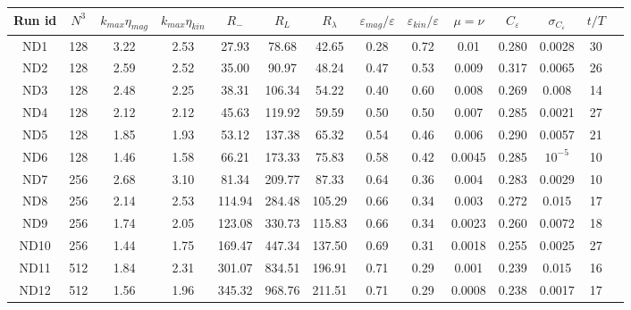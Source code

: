 \documentclass[aps,pre,onecolumn,superscriptaddress,notitlepage]{revtex4-1}
\newcommand{\Ceps}{C_\varepsilon}
\newcommand{\Rl}{R_{\lambda}}
\newcommand{\vep}{\varepsilon}
\begin{document}
 \begin{table}[]
 \begin{center}
 \begin{tabular}{cccccccccccccc}
   Run id & $N^3$  & $k_{max}\eta_{mag}$ & $k_{max}\eta_{kin}$ & $R_{-}$ & $R_L$ & $\Rl$ & $\vep_{mag}/\vep$ & $\vep_{kin}/\vep$ & $\mu = \nu $ & $\Ceps$ 
  & $\sigma_{\Ceps}$ & $t/T$ \\
  \hline
ND1 & 128 & 3.22 & 2.53 & 27.93 & 78.68 & 42.65 & 0.28 & 0.72& 0.01 & 0.280 & 0.0028 & 30 \\ %
ND2 & 128 & 2.59 & 2.52 & 35.00 & 90.97 & 48.24 & 0.47  & 0.53& 0.009 & 0.317 & 0.0065 & 26 \\ %
ND3 & 128 & 2.48 & 2.25 & 38.31 & 106.34 & 54.22 & 0.40& 0.60 & 0.008 & 0.269 & 0.008 & 14 \\ %
ND4 & 128 & 2.12 & 2.12 & 45.63 & 119.92 & 59.59 & 0.50 & 0.50& 0.007 & 0.285 & 0.0021 & 27 \\ %
ND5 & 128 & 1.85 & 1.93 & 53.12 & 137.38 & 65.32 & 0.54 & 0.46& 0.006 & 0.290 & 0.0057 & 21 \\ %
ND6 & 128 & 1.46 & 1.58 & 66.21 & 173.33 & 75.83 & 0.58& 0.42 & 0.0045 & 0.285 & $10^{-5}$ & 10 \\ %
ND7 & 256 & 2.68 & 3.10 & 81.34 & 209.77 & 87.33 & 0.64& 0.36& 0.004 & 0.283 & 0.0029 & 10 \\ %
ND8 & 256 & 2.14 & 2.53 & 114.94 & 284.48 & 105.29 & 0.66 & 0.34& 0.003 & 0.272 & 0.015 & 17 \\ %
ND9 & 256 & 1.74 & 2.05 & 123.08 & 330.73 & 115.83 & 0.66 & 0.34& 0.0023 & 0.260 & 0.0072 & 18 \\ %
ND10 & 256 & 1.44 & 1.75 & 169.47 & 447.34 & 137.50 & 0.69 & 0.31& 0.0018 & 0.255 & 0.0025 & 27 \\ %
ND11 & 512 & 1.84 & 2.31 & 301.07 & 834.51 & 196.91 & 0.71 & 0.29& 0.001 & 0.239 & 0.015 & 16 \\ %
ND12 & 512 & 1.56 & 1.96 & 345.32 & 968.76 & 211.51 & 0.71& 0.29& 0.0008 & 0.238 & 0.0017 & 17 \\ %

\end{tabular}
\end{center}
\end{table}
\end{document}
